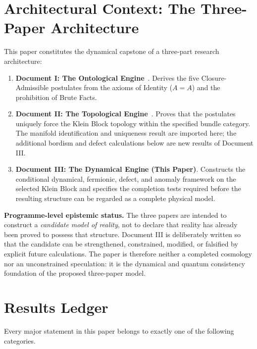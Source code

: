\documentclass[11pt]{article}
\theoremstyle{canonmath}
\theoremstyle{canonpostulate}
\theoremstyle{canonclaim}
\begin{document}
\section*{Architectural Context: The Three-Paper Architecture}
This paper constitutes the dynamical capstone of a three-part research architecture:

\begin{enumerate}
\item \textbf{Document I: The Ontological Engine}~\cite{CanonWhy}. Derives the five Closure-Admissible postulates from the axioms of Identity ($A=A$) and the prohibition of Brute Facts.
\item \textbf{Document II: The Topological Engine}~\cite{CanonWhat}. Proves that the postulates uniquely force the Klein Block topology within the specified bundle category. The manifold identification and uniqueness result are imported here; the additional bordism and defect calculations below are new results of Document III.
\item \textbf{Document III: The Dynamical Engine (This Paper)}. Constructs the conditional dynamical, fermionic, defect, and anomaly framework on the selected Klein Block and specifies the completion tests required before the resulting structure can be regarded as a complete physical model.
\end{enumerate}

\begin{keyresult}
\textbf{Programme-level epistemic status.} The three papers are intended to construct a \emph{candidate model of reality}, not to declare that reality has already been proved to possess that structure. Document III is deliberately written so that the candidate can be strengthened, constrained, modified, or falsified by explicit future calculations. The paper is therefore neither a completed cosmology nor an unconstrained speculation: it is the dynamical and quantum consistency foundation of the proposed three-paper model.
\end{keyresult}


\newpage
\section*{Results Ledger}
Every major statement in this paper belongs to exactly one of the following categories.
\end{document}

